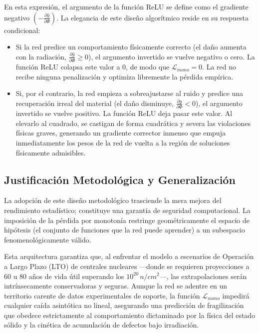 \documentclass[a4paper, 12pt, twocolumn]{book}
\begin{document}
En esta expresión, el argumento de la función ReLU se define como el gradiente negativo $\left(- \frac{\partial \hat{y}}{\partial \Phi}\right)$. La elegancia de este diseño algorítmico reside en su respuesta condicional:
\begin{itemize}
    \item Si la red predice un comportamiento físicamente correcto (el daño aumenta con la radiación, $\frac{\partial \hat{y}}{\partial \Phi} \ge 0$), el argumento invertido se vuelve negativo o cero. La función ReLU colapsa este valor a $0$, de modo que $\mathcal{L}_{mono} = 0$. La red no recibe ninguna penalización y optimiza libremente la pérdida empírica.
    \item Si, por el contrario, la red empieza a sobreajustarse al ruido y predice una recuperación irreal del material (el daño disminuye, $\frac{\partial \hat{y}}{\partial \Phi} < 0$), el argumento invertido se vuelve positivo. La función ReLU deja pasar este valor. Al elevarlo al cuadrado, se castigan de forma cuadrática y severa las violaciones físicas graves, generando un gradiente corrector inmenso que empuja inmediatamente los pesos de la red de vuelta a la región de soluciones físicamente admisibles.
\end{itemize}

\subsection{Justificación Metodológica y Generalización}

La adopción de este diseño metodológico trasciende la mera mejora del rendimiento estadístico; constituye una garantía de seguridad computacional. La imposición de la pérdida por monotonía restringe geométricamente el espacio de hipótesis (el conjunto de funciones que la red puede aprender) a un subespacio fenomenológicamente válido. 

Esta arquitectura garantiza que, al enfrentar el modelo a escenarios de Operación a Largo Plazo (LTO) de centrales nucleares —donde se requieren proyecciones a 60 u 80 años de vida útil superando los $10^{20} \, n/cm^2$—, las extrapolaciones serán intrínsecamente conservadoras y seguras. Aunque la red se adentre en un territorio carente de datos experimentales de soporte, la función $\mathcal{L}_{mono}$ impedirá cualquier caída asintótica no lineal, asegurando una predicción de fragilización que obedece estrictamente al comportamiento dictaminado por la física del estado sólido y la cinética de acumulación de defectos bajo irradiación.
\end{document}
